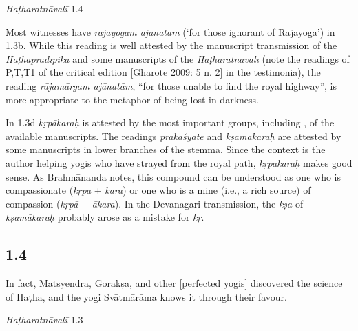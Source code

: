 \begin{ekdosis}
\begin{testimonia}[hp01_003]
\emph{Haṭharatnāvalī} 1.4

\begin{versinnote}
\tl{\var{rājayogam ] rājamārgam P,T,t1}\\!}
\end{versinnote}

\end{testimonia}

\begin{philcomm}[hp01_003] 
Most witnesses have \emph{rājayogam ajānatām} (`for those ignorant of Rājayoga') in 1.3b. While this reading is well attested by the manuscript transmission of the \emph{Haṭhapradīpikā} and some manuscripts of the \emph{Haṭharatnāvalī} (note the readings of P,T,T1 of the critical edition [Gharote 2009: 5 n. 2] in the testimonia), the reading \emph{rājamārgam ajānatām}, “for those unable to find the royal highway”, is more appropriate to the metaphor of being lost in darkness. 

In 1.3d \emph{kṛpākaraḥ} is attested by the most important groups, including \textalpha, of the available manuscripts. The readings \emph{prakāśyate} and \emph{kṣamākaraḥ} are attested by some manuscripts in lower branches of the stemma. Since the context is the author helping yogis who have strayed from the royal path, \emph{kṛpākaraḥ} makes good sense. As Brahmānanda notes, this compound can be understood as one who is compassionate (\emph{kṛpā} + \emph{kara}) or one who is a mine (i.e., a rich source) of compassion (\emph{kṛpā} + \emph{ākara}). In the Devanagari transmission, the \emph{kṣa} of \emph{kṣamākaraḥ} probably arose as a mistake for \emph{kṛ}.       
\end{philcomm}

\subsection*{1.4}
\begin{translation}[hp01_004]
In fact, Matsyendra, Gorakṣa, and other [perfected yogis] discovered the science of Haṭha, and the yogi Svātmārāma knows it through their favour.
\end{translation}

\begin{testimonia}[hp01_004]
\emph{Haṭharatnāvalī} 1.3


\end{testimonia}
\end{ekdosis}

